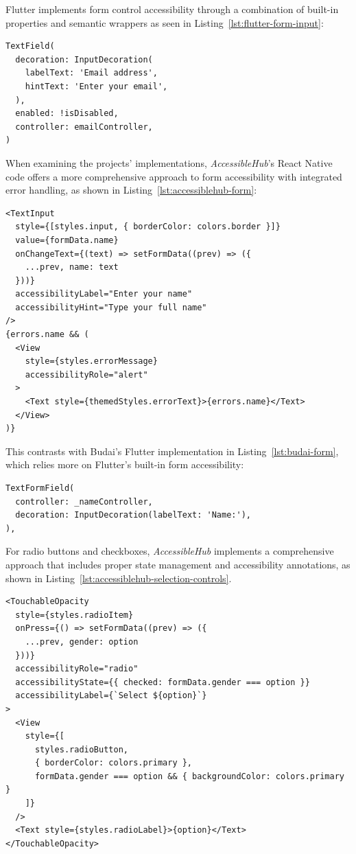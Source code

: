 Flutter implements form control accessibility through a combination of built-in properties and semantic wrappers as seen in Listing~\ref{lst:flutter-form-input}:

\begin{lstlisting}[style=DartStyle, caption=Accessible form input in Flutter, label=lst:flutter-form-input]
TextField(
  decoration: InputDecoration(
    labelText: 'Email address',
    hintText: 'Enter your email',
  ),
  enabled: !isDisabled,
  controller: emailController,
)
\end{lstlisting}

\pagebreak

When examining the projects' implementations, \textit{AccessibleHub}'s React Native code offers a more comprehensive approach to form accessibility with integrated error handling, as shown in Listing~\ref{lst:accessiblehub-form}:

\begin{lstlisting}[style=ReactNativeStyle, caption=Form implementation in \textit{AccessibleHub}'s React Native code, label=lst:accessiblehub-form]
<TextInput
  style={[styles.input, { borderColor: colors.border }]}
  value={formData.name}
  onChangeText={(text) => setFormData((prev) => ({
    ...prev, name: text
  }))}
  accessibilityLabel="Enter your name"
  accessibilityHint="Type your full name"
/>
{errors.name && (
  <View 
    style={styles.errorMessage} 
    accessibilityRole="alert"
  >
    <Text style={themedStyles.errorText}>{errors.name}</Text>
  </View>
)}
\end{lstlisting}

This contrasts with Budai's Flutter implementation in Listing~\ref{lst:budai-form}, which relies more on Flutter's built-in form accessibility:

\begin{lstlisting}[style=DartStyle, caption=Form implementation in Budai's Flutter code, label=lst:budai-form]
TextFormField(
  controller: _nameController,
  decoration: InputDecoration(labelText: 'Name:'),
),
\end{lstlisting}

\FloatBarrier

For radio buttons and checkboxes, \textit{AccessibleHub} implements a comprehensive approach that includes proper state management and accessibility annotations, as shown in Listing~\ref{lst:accessiblehub-selection-controls}.

\begin{lstlisting}[style=ReactNativeStyle, caption=Selection controls in \textit{AccessibleHub}, label=lst:accessiblehub-selection-controls]
<TouchableOpacity
  style={styles.radioItem}
  onPress={() => setFormData((prev) => ({ 
    ...prev, gender: option 
  }))}
  accessibilityRole="radio"
  accessibilityState={{ checked: formData.gender === option }}
  accessibilityLabel={`Select ${option}`}
>
  <View
    style={[
      styles.radioButton,
      { borderColor: colors.primary },
      formData.gender === option && { backgroundColor: colors.primary }
    ]}
  />
  <Text style={styles.radioLabel}>{option}</Text>
</TouchableOpacity>
\end{lstlisting}

